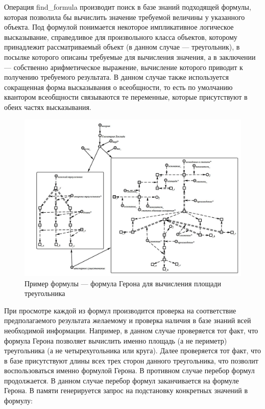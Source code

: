 Операция find\_formula производит поиск в базе знаний подходящей формулы, которая позволила бы вычислить значение требуемой величины у указанного объекта. Под формулой понимается некоторое импликативное логическое высказывание, справедливое для произвольного класса объектов, которому принадлежит рассматриваемый объект (в данном случае --- треугольник), в посылке которого описаны требуемые для вычисления значения, а в заключении --- собственно арифметическое выражение, вычисление которого приводит к получению требуемого результата. В данном случае также используется сокращенная форма высказывания о всеобщности, то есть по умолчанию квантором всеобщности связываются те переменные, которые присутствуют в обеих частях высказывания.

\begin{figure}[H]
	\includegraphics[width=1\linewidth]{images/part7/chapter_learning_systems/step4.jpg}
	\caption{Пример формулы --- формула Герона для вычисления площади треугольника}
	\label{fig:step4}
\end{figure}

При просмотре каждой из формул производится проверка на соответствие предполагаемого результата желаемому и проверка наличия в базе знаний всей необходимой информации. Например, в данном случае проверяется тот факт, что формула Герона позволяет вычислить именно площадь (а не периметр) треугольника (а не четырехугольника или круга). Далее проверяется тот факт, что в базе присутствуют длины всех трех сторон данного треугольника, что позволит воспользоваться именно формулой Герона. В противном случае перебор формул продолжается. В данном случае перебор формул заканчивается на формуле Герона. В памяти генерируется запрос на подстановку конкретных значений в формулу:

